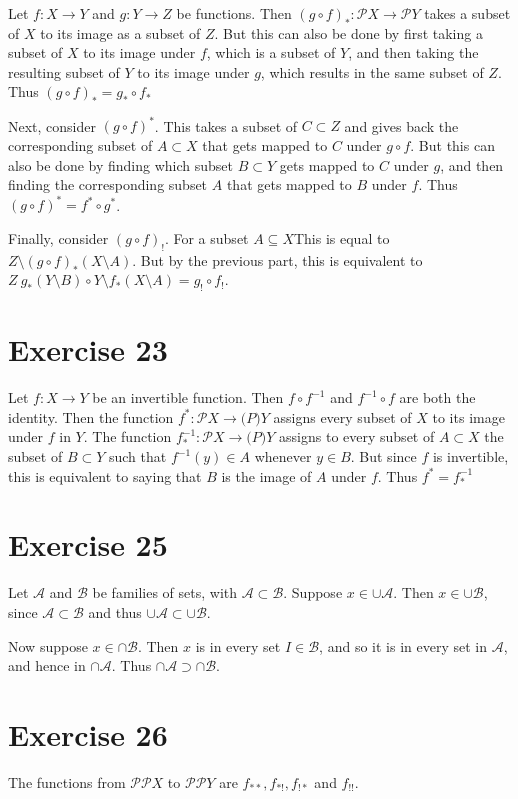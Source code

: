 \documentclass{article}
\begin{document}
Let $f: X \to Y$ and $g: Y \to Z$ be functions. Then $(g \circ f)_* : \mathcal{P}X \to \mathcal{P}Y$ takes a subset of $X$ to its image as a subset of $Z$. But this can also be done by first taking a subset
of $X$ to its image under $f$, which is a subset of $Y$, and then taking the resulting subset of $Y$ to its image under $g$, which results in the same subset of $Z$. Thus $(g \circ f)_* = g_* \circ f_*$

Next, consider $(g \circ f)^*$. This takes a subset of $C \subset Z$ and gives back the corresponding subset of $A \subset X$ that gets mapped to $C$ under $g \circ f$. But this can also be
done by finding which subset $B \subset Y$ gets mapped to $C$ under $g$, and then finding the corresponding subset $A$ that gets mapped to $B$ under $f$. Thus $(g \circ f)^* = f^* \circ g^*$.

Finally, consider $(g \circ f)_! $. For a subset $A \subseteq X$This is equal to $Z \setminus (g \circ f)_*(X \setminus A)$. But by the previous part, this is equivalent to 
$ Z \ g_* (Y \setminus B) \circ Y \setminus f_*(X \setminus A)  = g_! \circ f_!$.


\section{Exercise 23}

Let $f: X \to Y$ be an invertible function. Then $f \circ f^{-1}$ and $f^{-1} \circ f$ are both the identity. Then the function $f^* : \mathcal{P}X \to \mathcal(P)Y$ assigns every subset of $X$ to 
its image under $f$ in $Y$. The function $f^{-1}_* : \mathcal{P}X \to \mathcal(P)Y$ assigns to every subset of $A \subset X$ the subset of $B \subset Y$ such that $f^{-1}(y) \in A$ whenever $y \in B$. 
But since $f$ is invertible, this is equivalent to saying that $B$ is the image of $A$ under $f$. Thus $f^* = f^{-1}_*$ 

\section{Exercise 25}

Let $\mathcal{A}$ and $\mathcal{B}$ be families of sets, with $\mathcal{A} \subset \mathcal{B}$. Suppose $x \in \cup \mathcal{A}$. Then $x \in \cup \mathcal{B}$, since $\mathcal{A} \subset \mathcal{B}$
and thus $\cup \mathcal{A} \subset \cup \mathcal{B}$. 

Now suppose $x \in \cap \mathcal{B}$. Then $x$ is in every set $I \in \mathcal{B}$, and so it is in every set in $\mathcal{A}$, and hence in $\cap \mathcal{A}$. Thus $\cap\mathcal{A} \supset \cap\mathcal{B}$.
\section{Exercise 26}

The functions from $\mathcal{P}\mathcal{P}X  $ to $\mathcal{P}\mathcal{P}Y$ are $f_{**}, f_{*!}, f_{!*}$ and $f_{!!}$.
\end{document}
